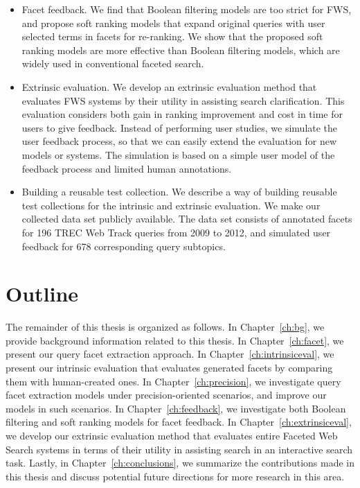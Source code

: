 \begin{itemize}
 
\item Facet feedback. We find that Boolean filtering models are too strict for FWS, and propose soft ranking models that expand original queries with user selected terms in facets for re-ranking. We show that the proposed soft ranking models are more effective than Boolean filtering models, which are widely used in conventional faceted search.
 
\item Extrinsic evaluation. We develop an extrinsic evaluation method that evaluates FWS systems by their utility in assisting search clarification. This evaluation considers both gain in ranking improvement and cost in time for users to give feedback. Instead of performing user studies, we simulate the user feedback process, so that we can easily extend the evaluation for new models or systems. The simulation is based on a simple user model of the feedback process and limited human annotations.

\item Building a reusable test collection. We describe a way of building reusable test collections for the intrinsic and extrinsic evaluation. We make our collected data set publicly available. The data set consists of annotated facets for 196 TREC Web Track queries from 2009 to 2012, and simulated user feedback for 678 corresponding query subtopics.

\end{itemize}

\section{Outline}
The remainder of this thesis is organized as follows. 
In Chapter~\ref{ch:bg}, we provide background information related to this thesis. In Chapter~\ref{ch:facet}, we present our query facet extraction approach. 
In Chapter~\ref{ch:intrinsiceval}, we present our intrinsic evaluation that evaluates generated facets by comparing them with human-created ones.
In Chapter~\ref{ch:precision}, we investigate query facet extraction models under precision-oriented scenarios, and improve our models in such scenarios.
In Chapter~\ref{ch:feedback}, we investigate both Boolean filtering and soft ranking models for facet feedback.
In Chapter~\ref{ch:extrinsiceval}, we develop our extrinsic evaluation method that evaluates entire Faceted Web Search systems in terms of their utility in assisting search in an interactive search task.
Lastly, in Chapter~\ref{ch:conclusions}, we summarize the contributions made in this thesis and discuss potential future directions for more research in this area.




